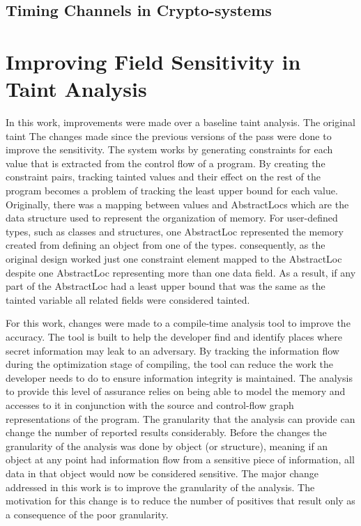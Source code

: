 \documentclass[11pt,a4paper]{article}
\begin{document}
\subsection{Timing Channels in Crypto-systems}

\section{Improving Field Sensitivity in Taint Analysis}

  In this work, improvements were made over a baseline taint analysis. The
  original taint  
  The changes made since the previous versions of the pass were done to improve
  the sensitivity. The system works by generating constraints for each value that
  is extracted from the control flow of a program. By creating the constraint
  pairs, tracking tainted values and their effect on  the rest of the program
  becomes a problem of tracking the least upper bound for each value.  Originally,
  there was a mapping between values and AbstractLocs which are the data structure
  used to represent the organization of memory. For user-defined types, such as
  classes and structures, one AbstractLoc represented the memory created from
  defining an object from one of the types. consequently, as the original design
  worked just one constraint element mapped to the AbstractLoc despite one
  AbstractLoc representing more than one data field. As a result, if any part of
  the AbstractLoc had a least upper bound that was the same as the tainted
  variable all related fields were considered tainted.

  For this work, changes were made to a compile-time analysis tool to improve the
  accuracy. The tool is built to help the developer find and identify places where
  secret information may leak to an adversary. By tracking the information flow
  during the optimization stage of compiling, the tool can reduce the work the
  developer needs to do to ensure information integrity is maintained. The
  analysis to provide this level of assurance relies on being able to model the
  memory and accesses to it in conjunction with the source and control-flow graph
  representations of the program. The granularity that the analysis can provide
  can change the number of reported results considerably. Before the changes the
  granularity of the analysis was done by object (or structure), meaning if an
  object at any point had information flow from a sensitive piece of information,
  all data in that object would now be considered sensitive. The major change
  addressed in this work is to improve the granularity of the analysis. The
  motivation for this change is to reduce the number of positives that result only
  as a consequence of the poor granularity.
\end{document}
